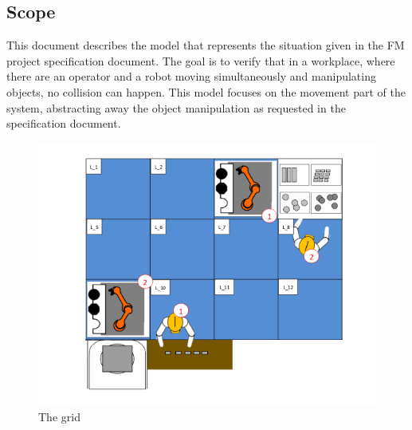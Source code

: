 \subsection{Scope}

This document describes the model that represents the situation given in the FM project specification document. The goal is to verify that in a workplace, where there are an operator and a robot moving simultaneously and manipulating objects, no collision can happen.
This model focuses on the movement part of the system, abstracting away the object manipulation as requested in the specification document.

\begin{figure}[H]
	\centering
	\includegraphics[width=\linewidth]{pictures/grid.png}
	\caption{The grid}
\end{figure}


